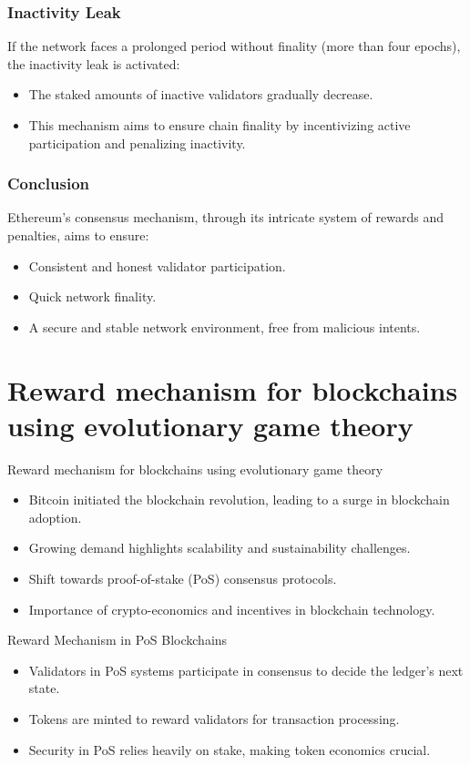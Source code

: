 \documentclass{beamer}
\begin{document}
\begin{frame}
    \frametitle{Inactivity Leak}
    If the network faces a prolonged period without finality (more than four epochs), the inactivity leak is activated:
    \begin{itemize}
        \item The staked amounts of inactive validators gradually decrease.
        \item This mechanism aims to ensure chain finality by incentivizing active participation and penalizing inactivity.
    \end{itemize}
\end{frame}

\begin{frame}
    \frametitle{Conclusion}
    Ethereum's consensus mechanism, through its intricate system of rewards and penalties, aims to ensure:
    \begin{itemize}
        \item Consistent and honest validator participation.
        \item Quick network finality.
        \item A secure and stable network environment, free from malicious intents.
    \end{itemize}
\end{frame}
\section{Reward mechanism for blockchains using evolutionary game theory}
\begin{frame}{Reward mechanism for blockchains using evolutionary game theory\cite{reward1}}
\begin{itemize}
\item Bitcoin initiated the blockchain revolution, leading to a surge in blockchain adoption.
\item Growing demand highlights scalability and sustainability challenges.
\item Shift towards proof-of-stake (PoS) consensus protocols.
\item Importance of crypto-economics and incentives in blockchain technology.
\end{itemize}
\end{frame}

\begin{frame}{Reward Mechanism in PoS Blockchains}
\begin{itemize}
\item Validators in PoS systems participate in consensus to decide the ledger's next state.
\item Tokens are minted to reward validators for transaction processing.
\item Security in PoS relies heavily on stake, making token economics crucial.
\end{itemize}
\end{frame}
\end{document}
